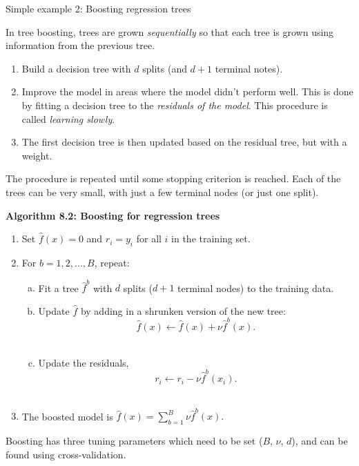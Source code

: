 \documentclass[
  10pt,
  ignorenonframetext,
]{beamer}
\providecommand{\tightlist}{%
  \setlength{\itemsep}{0pt}\setlength{\parskip}{0pt}}
\begin{document}
\begin{frame}{Simple example 2: Boosting regression trees}
\protect\hypertarget{simple-example-2-boosting-regression-trees}{}
\(~\)

In tree boosting, trees are grown \emph{sequentially} so that each tree
is grown using information from the previous tree.

\vspace{2mm}

\begin{enumerate}
\tightlist
\item
  Build a decision tree with \(d\) splits (and \(d+1\) terminal notes).
\item
  Improve the model in areas where the model didn't perform well. This
  is done by fitting a decision tree to the \emph{residuals of the
  model}. This procedure is called \emph{learning slowly}.
\item
  The first decision tree is then updated based on the residual tree,
  but with a weight.
\end{enumerate}

The procedure is repeated until some stopping criterion is reached. Each
of the trees can be very small, with just a few terminal nodes (or just
one split).
\end{frame}

\begin{frame}
\textbf{Algorithm 8.2: Boosting for regression trees}

\vspace{2mm}

\begin{enumerate}
\tightlist
\item
  Set \(\hat{f}(x) = 0\) and \(r_i = y_i\) for all \(i\) in the training
  set.
\item
  For \(b=1,2,...,B\), repeat:

  \begin{enumerate}
  [a)]
  \tightlist
  \item
    Fit a tree \(\hat{f}^b\) with \(d\) splits (\(d+1\) terminal nodes)
    to the training data.\\
  \item
    Update \(\hat{f}\) by adding in a shrunken version of the new tree:
    \[\hat{f}(x) \leftarrow \hat{f}(x)+\nu \hat{f}^b(x).\]\\
  \item
    Update the residuals, \[r_i \leftarrow r_i - \nu \hat{f}^b(x_i).\]\\
  \end{enumerate}
\item
  The boosted model is \(\hat{f}(x) = \sum_{b=1}^B \nu \hat{f}^b(x).\)
\end{enumerate}

\vspace{4mm}

Boosting has three tuning parameters which need to be set (\(B\),
\(\nu\), \(d\)), and can be found using cross-validation.
\end{frame}
\end{document}
